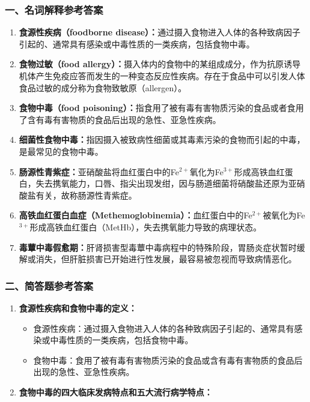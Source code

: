 {\subsubsection*{一、名词解释参考答案}
\begin{enumerate}[leftmargin=*, itemsep=4pt]
    \item \textbf{食源性疾病（foodborne disease）：}通过摄入食物进入人体的各种致病因子引起的、通常具有感染或中毒性质的一类疾病，包括食物中毒。
    \item \textbf{食物过敏（food allergy）：}摄入体内的食物中的某组成成分，作为抗原诱导机体产生免疫应答而发生的一种变态反应性疾病。存在于食品中可以引发人体食品过敏的成分称为食物致敏原（allergen）。
    \item \textbf{食物中毒（food poisoning）：}指食用了被有毒有害物质污染的食品或者食用了含有毒有害物质的食品后出现的急性、亚急性疾病。
    \item \textbf{细菌性食物中毒：}指因摄入被致病性细菌或其毒素污染的食物而引起的中毒，是最常见的食物中毒。
    \item \textbf{肠源性青紫症：}亚硝酸盐将血红蛋白中的Fe$^{2+}$氧化为Fe$^{3+}$形成高铁血红蛋白，失去携氧能力，口唇、指尖出现发绀，因与肠道细菌将硝酸盐还原为亚硝酸盐有关，故称肠源性青紫症。
    \item \textbf{高铁血红蛋白血症（Methemoglobinemia）：}血红蛋白中的Fe$^{2+}$被氧化为Fe$^{3+}$形成高铁血红蛋白（MetHb），失去携氧能力导致的病理状态。
    \item \textbf{毒蕈中毒假愈期：}肝肾损害型毒蕈中毒病程中的特殊阶段，胃肠炎症状暂时缓解或消失，但肝脏损害已开始进行性发展，最容易被忽视而导致病情恶化。
\end{enumerate}

\subsubsection*{二、简答题参考答案}
\begin{enumerate}[leftmargin=*, itemsep=4pt]
    \item \textbf{食源性疾病和食物中毒的定义：}
    \begin{itemize}[leftmargin=*]
        \item 食源性疾病：通过摄入食物进入人体的各种致病因子引起的、通常具有感染或中毒性质的一类疾病，包括食物中毒。
        \item 食物中毒：食用了被有毒有害物质污染的食品或含有毒有害物质的食品后出现的急性、亚急性疾病。
    \end{itemize}

    \item \textbf{食物中毒的四大临床发病特点和五大流行病学特点：}


\end{enumerate}}
